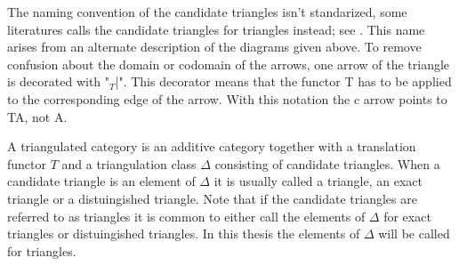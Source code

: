 
    The naming convention of the candidate triangles isn't standarized, some literatures calls the candidate triangles for triangles instead;  see \cite{keller}. This name arises from an alternate description of the diagrams given above. To remove confusion about the domain or codomain of the arrows, one arrow of the triangle is decorated with  "$_T$|". This decorator means that the functor T has to be applied to the corresponding edge of the arrow. With this notation the c arrow points to TA, not A.

    \begin{center}
    \end{center}

     A triangulated category is an additive category together with a translation functor $T$ and a triangulation class $\Delta$ consisting of candidate triangles. When a candidate triangle is an element of $\Delta$ it is usually called a triangle, an exact triangle or a distuingished triangle. Note that if the candidate triangles are referred to as triangles it is common to either call the elements of $\Delta$ for exact triangles or distuingished triangles. In this thesis the elements of $\Delta$ will be called for triangles.


